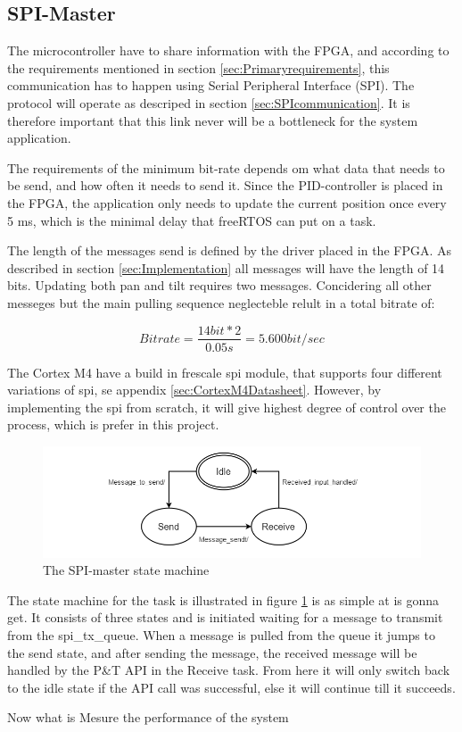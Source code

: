 \subsection{SPI-Master}
\label{sec:SPIMaster}

The microcontroller have to share information with the FPGA, and according to the requirements mentioned in section \ref{sec:Primaryrequirements}, this communication has to happen using Serial Peripheral Interface (SPI). The protocol will operate as descriped in section \ref{sec:SPIcommunication}. It is therefore important that this link never will be a bottleneck for the system application. 

The requirements of the minimum bit-rate depends om what data that needs to be send, and how often it needs to send it. Since the PID-controller is placed in the FPGA, the application only needs to update the current position once every 5 ms, which is the minimal delay that freeRTOS can put on a task. 

The length of the messages send is defined by the driver placed in the FPGA. As described in section \ref{sec:Implementation} all messages will have the length of 14 bits. Updating both pan and tilt requires two messages. Concidering all other messeges but the main pulling sequence neglecteble relult in a total bitrate of:

\begin{equation}
Bitrate = \frac{
14 bit * 2	
}{
0.05s
} = 5.600 bit/sec 
\end{equation}

The Cortex M4 have a build in frescale spi module, that supports four different variations of spi, se appendix \ref{sec:CortexM4Datasheet}. However, by implementing the spi from scratch, it will give highest degree of control over the process, which is prefer in this project. 

\begin{figure}
	\centering
	\includegraphics[scale = 0.7] {Billeder/SPI-master}
	\caption{The SPI-master state machine}
	\label{fig:SPI-master}
\end{figure}

The state machine for the task is illustrated in figure \ref{fig:SPI-master} is as simple at is gonna get. It consists of three states and is initiated waiting for a message to transmit from the spi\_tx\_queue. When a message is pulled from the queue it jumps to the send state, and after sending the message, the received message will be handled by the P\&T API in the Receive task. From here it will only switch back to the idle state if the API call was successful, else it will continue till it succeeds. 

Now what is Mesure the performance of the system 
 

 



